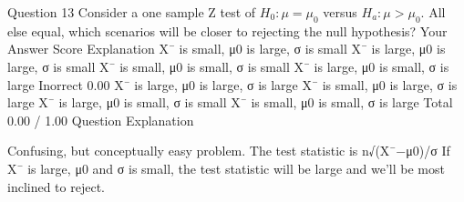 Question 13
Consider a one sample Z test of $H_0 : \mu = \mu_0$ versus $H_a : \mu > \mu_0$. All else equal, which scenarios will be closer to rejecting the null hypothesis?
Your Answer                Score        Explanation
X¯ is small, μ0 is large, σ is small                        
X¯ is large, μ0 is large, σ is small                        
X¯ is small, μ0 is small, σ is small                        
X¯ is large, μ0 is small, σ is large        Inorrect        0.00        
X¯ is large, μ0 is large, σ is large                        
X¯ is small, μ0 is large, σ is large                        
X¯ is large, μ0 is small, σ is small                        
X¯ is small, μ0 is small, σ is large                        
Total                0.00 / 1.00        
Question Explanation

Confusing, but conceptually easy problem. The test statistic is n√(X¯−μ0)/σ If X¯ is large, μ0 and σ is small, the test statistic will be large and we'll be most inclined to reject.
